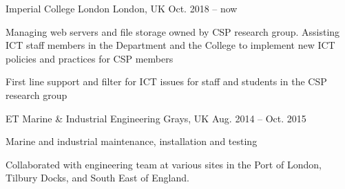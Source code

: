

\begin{cventries}
            {Imperial College London} %
            {London, UK} %
            {Oct. 2018 -- now} %
            {
                \begin{cvitems} %
                    \item {Managing web servers and file storage owned by CSP research group. Assisting ICT staff members in the Department and the College to implement new ICT policies and practices for CSP members}
                    \item {First line support and filter for ICT issues for staff and students in the CSP research group}
                \end{cvitems}
            }

            {ET Marine	\& Industrial Engineering} %
            {Grays, UK} %
            {Aug. 2014 -- Oct. 2015} %
            {
                \begin{cvitems} %
                    \item {Marine and industrial maintenance, installation and testing}
                    \item {Collaborated with engineering team at various sites in the Port of London, Tilbury Docks, and South East of England.}
                \end{cvitems}
            }
\end{cventries}
